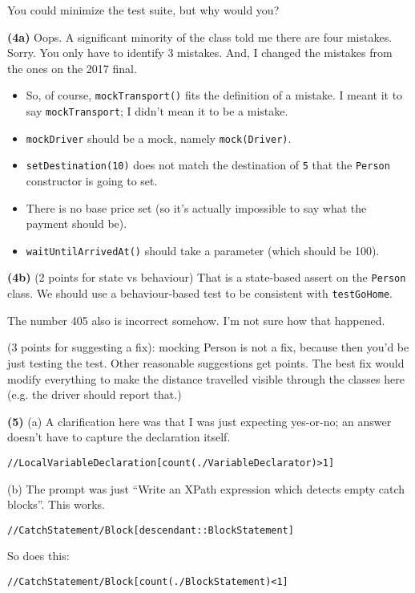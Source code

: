 \documentclass[11pt,onecolumn,letterpaper]{article}
\newcounter{qNum}
\newcommand{\q}[1]{%
\textbf{(#1)}\stepcounter{qNum}}
\begin{document}
You could minimize the test suite, but why would you?


\newpage

\q{4a} Oops. A significant minority of the class told me there are four mistakes.
Sorry. You only have to
identify 3 mistakes. And, I changed the mistakes from the ones on the 2017 final.

\begin{itemize}[noitemsep]
\item So, of course, {\tt mockTransport()} fits the definition of a mistake. I meant it to say
{\tt mockTransport}; I didn't mean it to be a mistake.

\item {\tt mockDriver} should be a mock, namely {\tt mock(Driver)}.
\item {\tt setDestination(10)} does not match the destination of {\tt 5} that the {\tt Person} constructor
  is going to set.
\item There is no base price set (so it's actually impossible to say what the payment should be).
\item {\tt waitUntilArrivedAt()} should take a parameter (which should be 100).
\end{itemize}

\q{4b} (2 points for state vs behaviour) That is a state-based assert on the {\tt Person} class. We should use a behaviour-based test to be consistent
with {\tt testGoHome}.

The number 405 also is incorrect somehow. I'm not sure how that happened. 


(3 points for suggesting a fix): mocking Person is not a fix, because then you'd be just testing the test.
Other reasonable suggestions get points. The best fix would modify everything to make the distance travelled
visible through the classes here (e.g. the driver should report that.)

\q{5} (a) A clarification here was that I was just expecting yes-or-no; an answer doesn't have to capture
the declaration itself.

\begin{verbatim}
//LocalVariableDeclaration[count(./VariableDeclarator)>1]
\end{verbatim}

(b) The prompt was just ``Write an XPath expression which detects empty catch blocks''.
This works.
\begin{verbatim}
//CatchStatement/Block[descendant::BlockStatement]
\end{verbatim}
So does this:
\begin{verbatim}
//CatchStatement/Block[count(./BlockStatement)<1]
\end{verbatim}
\end{document}
